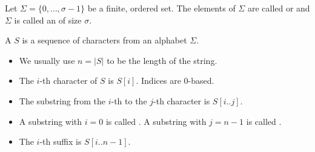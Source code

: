 \begin{Definition}
  Let $\Sigma = \{0, \ldots, \sigma - 1\}$ be a finite, ordered set. The elements of $\Sigma$ are called  or  and $\Sigma$ is called an  of size $\sigma$.
\end{Definition}

\begin{Definition}
  A  $S$ is a sequence of characters from an alphabet $\Sigma$.
  \begin{itemize}
    \item We usually use $n = \vert S \vert$ to be the length of the string.
    \item The $i$-th character of $S$ is $S[i]$. Indices are $0$-based.
    \item The substring from the $i$-th to the $j$-th character is $S[i..j]$.
    \item A substring with $i = 0$ is called . A substring with $j = n - 1$ is called .
    \item The $i$-th suffix is $S[i..n-1]$.
  \end{itemize}
\end{Definition}
